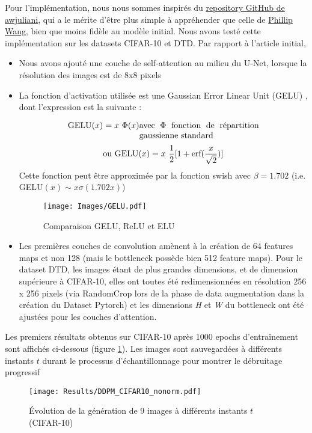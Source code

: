 \documentclass{article}
\begin{document}
Pour l'implémentation, nous nous sommes inspirés du \href{https://github.com/awjuliani/pytorch-diffusion}{repository GitHub de awjuliani}, qui a le mérite d'être plus simple à appréhender que celle de \href{https://github.com/lucidrains/denoising-diffusion-pytorch}{Phillip Wang}, bien que moins fidèle au modèle initial. Nous avons testé cette implémentation sur les datasets CIFAR-10 et DTD. Par rapport à l'article initial,
\begin{itemize}
    \item Nous avons ajouté une couche de self-attention au milieu du U-Net, lorsque la résolution des images est de 8x8 pixels
    \item La fonction d'activation utilisée est une Gaussian Error Linear Unit (GELU) \cite{gelu}, dont l'expression est la suivante : \\
    \begin{minipage}{.5\textwidth}
        $$\text{GELU}(x) = x \nobreakspace \Phi(x) \parbox[t]{5cm}{ avec $\Phi$ fonction de répartition gaussienne standard}$$
        $$\text{ou GELU}(x) = x \nobreakspace \dfrac{1}{2}[1 + \text{erf}(\dfrac{x}{\sqrt{2}})]$$
        Cette fonction peut être approximée par la fonction swish avec $\beta = 1.702$ (i.e. GELU$(x) \sim x \sigma(1.702x)$)
    \end{minipage}
    \begin{minipage}{.5\textwidth}
        \begin{figure}[H]
            \centering
            \texttt{[image: Images/GELU.pdf]}
            \caption{Comparaison GELU, ReLU et ELU}
        \end{figure}
    \end{minipage}
    \item Les premières couches de convolution amènent à la création de 64 features maps et non 128 (mais le bottleneck possède bien 512 feature maps). Pour le dataset DTD, les images étant de plus grandes dimensions, et de dimension supérieure à CIFAR-10, elles ont toutes été redimensionnées en résolution 256 x 256 pixels (via RandomCrop lors de la phase de data augmentation dans la création du Dataset Pytorch) et les dimensions \textit{H} et \textit{W} du bottleneck ont été ajustées pour les couches d'attention.
\end{itemize}

Les premiers résultats obtenus sur CIFAR-10 après 1000 epochs d'entraînement sont affichés ci-dessous (figure \ref{results_ddpm_cifar10}). Les images sont sauvegardées à différents instants $t$ durant le processus d'échantillonnage pour montrer le débruitage progressif
\begin{figure}[H]
    \centering
    \texttt{[image: Results/DDPM\_CIFAR10\_nonorm.pdf]}
    \caption{Évolution de la génération de 9 images à différents instants $t$ (CIFAR-10)}
    \label{results_ddpm_cifar10}
\end{figure}
\end{document}
